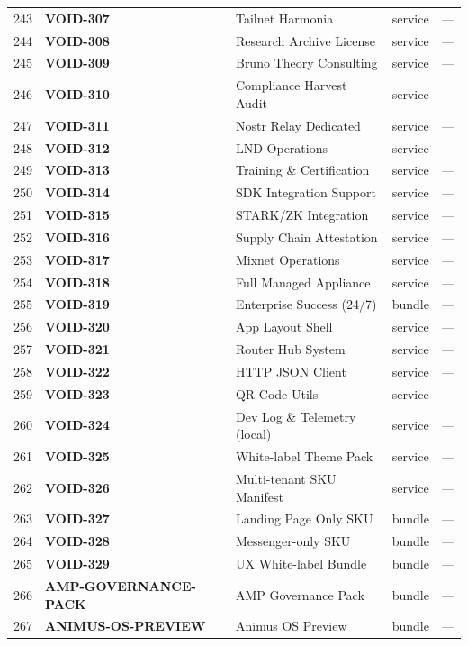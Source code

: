 \documentclass[10pt,a4paper,landscape]{article}
\begin{document}
\begin{longtable}{@{}rl p{4.2cm} p{1.4cm} p{3.8cm}@{}}
243 & \textbf{VOID-307} & Tailnet Harmonia & service & — \\
244 & \textbf{VOID-308} & Research Archive License & service & — \\
245 & \textbf{VOID-309} & Bruno Theory Consulting & service & — \\
246 & \textbf{VOID-310} & Compliance Harvest Audit & service & — \\
247 & \textbf{VOID-311} & Nostr Relay Dedicated & service & — \\
248 & \textbf{VOID-312} & LND Operations & service & — \\
249 & \textbf{VOID-313} & Training \& Certification & service & — \\
250 & \textbf{VOID-314} & SDK Integration Support & service & — \\
251 & \textbf{VOID-315} & STARK/ZK Integration & service & — \\
252 & \textbf{VOID-316} & Supply Chain Attestation & service & — \\
253 & \textbf{VOID-317} & Mixnet Operations & service & — \\
254 & \textbf{VOID-318} & Full Managed Appliance & service & — \\
255 & \textbf{VOID-319} & Enterprise Success (24/7) & bundle & — \\
256 & \textbf{VOID-320} & App Layout Shell & service & — \\
257 & \textbf{VOID-321} & Router Hub System & service & — \\
258 & \textbf{VOID-322} & HTTP JSON Client & service & — \\
259 & \textbf{VOID-323} & QR Code Utils & service & — \\
260 & \textbf{VOID-324} & Dev Log \& Telemetry (local) & service & — \\
261 & \textbf{VOID-325} & White-label Theme Pack & service & — \\
262 & \textbf{VOID-326} & Multi-tenant SKU Manifest & service & — \\
263 & \textbf{VOID-327} & Landing Page Only SKU & bundle & — \\
264 & \textbf{VOID-328} & Messenger-only SKU & bundle & — \\
265 & \textbf{VOID-329} & UX White-label Bundle & bundle & — \\
266 & \textbf{AMP-GOVERNANCE-PACK} & AMP Governance Pack & bundle & — \\
267 & \textbf{ANIMUS-OS-PREVIEW} & Animus OS Preview & bundle & — \\

\end{longtable}
\end{document}
